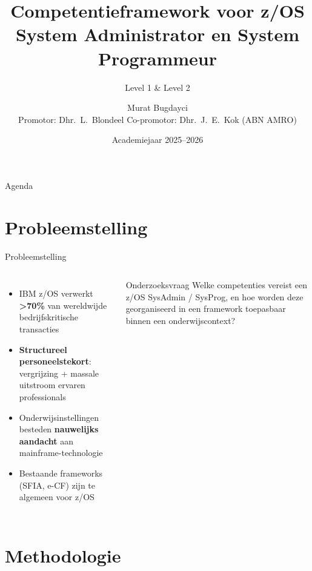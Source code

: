 \documentclass[aspectratio=169]{beamer}
\title{Competentieframework voor z/OS System Administrator en System Programmeur}
\subtitle{Level 1 \& Level 2}
\author{Murat Bugdayci \\ Promotor: Dhr.\ L.\ Blondeel Co-promotor: Dhr.\ J.\ E.\ Kok (ABN AMRO)}
\institute{Hogeschool Gent}
\date{Academiejaar 2025--2026}
\begin{document}

\begin{frame}
  \titlepage
\end{frame}

\begin{frame}{Agenda}
  \tableofcontents
\end{frame}

\section{Probleemstelling}

\begin{frame}{Probleemstelling}
  \begin{columns}
      \begin{itemize}
        \item IBM z/OS verwerkt \textbf{>70\%} van wereldwijde bedrijfskritische transacties
        \item \textbf{Structureel personeelstekort}: vergrijzing + massale uitstroom ervaren professionals
        \item Onderwijsinstellingen besteden \textbf{nauwelijks aandacht} aan mainframe-technologie
        \item Bestaande frameworks (SFIA, e-CF) zijn te algemeen voor z/OS
      \end{itemize}
      \begin{block}{Onderzoeksvraag}
        Welke competenties vereist een z/OS SysAdmin / SysProg, en hoe worden deze georganiseerd in een framework toepasbaar binnen een onderwijscontext?
      \end{block}
  \end{columns}
\end{frame}

\section{Methodologie}
\end{document}
